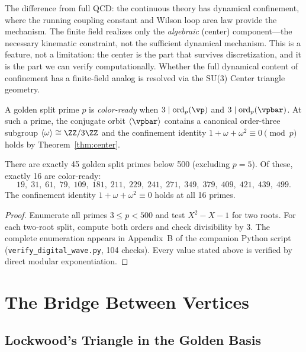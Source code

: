 The difference from full QCD: the continuous theory has dynamical confinement, where the running coupling constant and Wilson loop area law provide the mechanism. The finite field realizes only the \emph{algebraic} (center) component---the necessary kinematic constraint, not the sufficient dynamical mechanism. This is a feature, not a limitation: the center is the part that survives discretization, and it is the part we can verify computationally. Whether the full dynamical content of confinement has a finite-field analog is resolved via the SU(3) Center triangle geometry.

\begin{definition}\label{def:colorready}
A golden split prime $p$ is \emph{color-ready} when $3 \mid \mathrm{ord}_p(\vp)$ and $3 \mid \mathrm{ord}_p(\vpbar)$. At such a prime, the conjugate orbit $\langle \vpbar \rangle$ contains a canonical order-three subgroup $\langle \omega \rangle \cong \ZZ/3\ZZ$ and the confinement identity $1 + \omega + \omega^2 \equiv 0 \pmod{p}$ holds by Theorem~\ref{thm:center}.
\end{definition}

\begin{proposition}\label{prop:survey}
There are exactly 45 golden split primes below 500 (excluding $p = 5$). Of these, exactly 16 are color-ready:
\[
19,\; 31,\; 61,\; 79,\; 109,\; 181,\; 211,\; 229,\; 241,\; 271,\; 349,\; 379,\; 409,\; 421,\; 439,\; 499.
\]
The confinement identity $1 + \omega + \omega^2 \equiv 0$ holds at all 16 primes.
\end{proposition}

\begin{proof}
Enumerate all primes $3 \leq p < 500$ and test $X^2 - X - 1$ for two roots. For each two-root split, compute both orders and check divisibility by 3. The complete enumeration appears in Appendix~B of the companion Python script (\texttt{verify\_digital\_wave.py}, 104 checks). Every value stated above is verified by direct modular exponentiation. \qedhere
\end{proof}


\section{The Bridge Between Vertices}

\subsection{Lockwood's Triangle in the Golden Basis}

